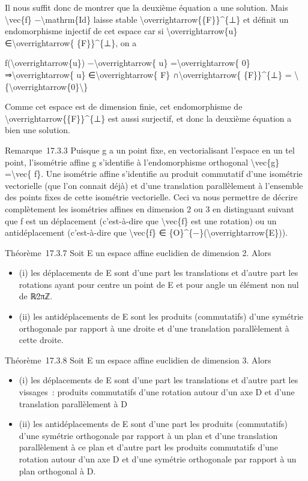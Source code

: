 \documentclass[]{article}
\begin{document}
Il nous suffit donc de montrer que la deuxième équation a une solution.
Mais \textbackslash{}vec\{f\} −\textbackslash{}mathrm\{Id\} laisse
stable \textbackslash{}overrightarrow\{\{F\}\}\^{}\{⊥\} et définit un
endomorphisme injectif de cet espace car si
\textbackslash{}overrightarrow\{u\} ∈\textbackslash{}overrightarrow\{
\{F\}\}\^{}\{⊥\}, on a

f(\textbackslash{}overrightarrow\{u\}) −\textbackslash{}overrightarrow\{
u\} =\textbackslash{}overrightarrow\{ 0\}
⇒\textbackslash{}overrightarrow\{ u\} ∈\textbackslash{}overrightarrow\{
F\} ∩\textbackslash{}overrightarrow\{ \{F\}\}\^{}\{⊥\} =
\textbackslash{}\{\textbackslash{}overrightarrow\{0\}\textbackslash{}\}

Comme cet espace est de dimension finie, cet endomorphisme de
\textbackslash{}overrightarrow\{\{F\}\}\^{}\{⊥\} est aussi surjectif, et
donc la deuxième équation a bien une solution.

Remarque~17.3.3 Puisque g a un point fixe, en vectorialisant l'espace en
un tel point, l'isométrie affine g s'identifie à l'endomorphisme
orthogonal \textbackslash{}vec\{g\} =\textbackslash{}vec\{ f\}. Une
isométrie affine s'identifie au produit commutatif d'une isométrie
vectorielle (que l'on connait déjà) et d'une translation parallèlement à
l'ensemble des points fixes de cette isométrie vectorielle. Ceci va nous
permettre de décrire complètement les isométries affines en dimension 2
ou 3 en distinguant suivant que f est un déplacement (c'est-à-dire que
\textbackslash{}vec\{f\} est une rotation) ou un antidéplacement
(c'est-à-dire que \textbackslash{}vec\{f\} ∈
\{O\}\^{}\{−\}(\textbackslash{}overrightarrow\{E\})).

Théorème~17.3.7 Soit E un espace affine euclidien de dimension 2. Alors

\begin{itemize}
\itemsep1pt\parskip0pt
\item
  (i) les déplacements de E sont d'une part les translations et d'autre
  part les rotations ayant pour centre un point de E et pour angle un
  élément non nul de ℝ∕2πℤ.
\item
  (ii) les antidéplacements de E sont les produits (commutatifs) d'une
  symétrie orthogonale par rapport à une droite et d'une translation
  parallèlement à cette droite.
\end{itemize}

Théorème~17.3.8 Soit E un espace affine euclidien de dimension 3. Alors

\begin{itemize}
\itemsep1pt\parskip0pt
\item
  (i) les déplacements de E sont d'une part les translations et d'autre
  part les vissages~: produits commutatifs d'une rotation autour d'un
  axe D et d'une translation parallèlement à D
\item
  (ii) les antidéplacements de E sont d'une part les produits
  (commutatifs) d'une symétrie orthogonale par rapport à un plan et
  d'une translation parallèlement à ce plan et d'autre part les produits
  commutatifs d'une rotation autour d'un axe D et d'une symétrie
  orthogonale par rapport à un plan orthogonal à D.
\end{itemize}
\end{document}
